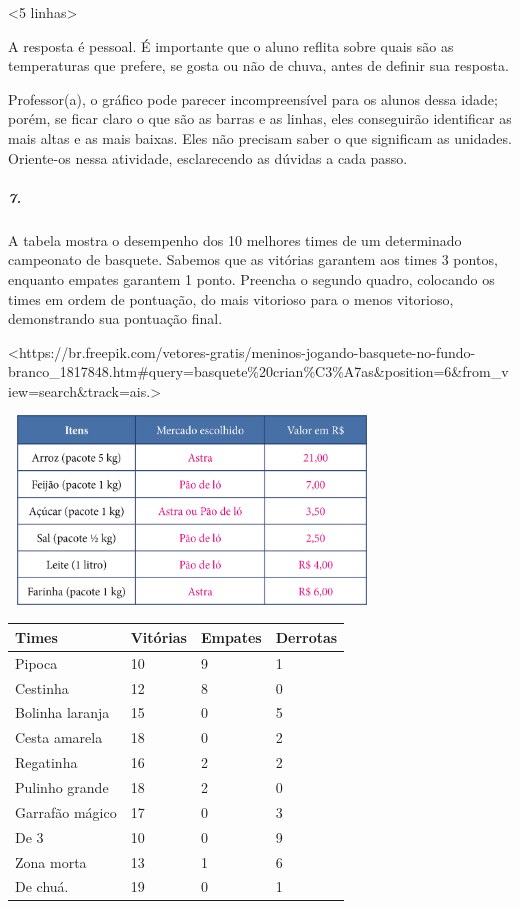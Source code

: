\textless{}5 linhas\textgreater{}

A resposta é pessoal. É importante que o aluno reflita sobre quais são as temperaturas que prefere, se gosta ou não de chuva, antes de definir sua resposta.

Professor(a), o gráfico pode parecer incompreensível para os alunos dessa idade; porém, se ficar claro o que são as barras e as linhas, eles
conseguirão identificar as mais altas e as mais baixas. Eles não
precisam saber o que significam as unidades. Oriente-os nessa atividade, esclarecendo as dúvidas a cada passo.

\subparagraph{7.}\label{section-82}

A tabela mostra o desempenho dos 10 melhores times de um
determinado campeonato de basquete. Sabemos que as vitórias garantem aos
times 3 pontos, enquanto empates garantem 1 ponto. Preencha o segundo quadro,
colocando os times em ordem de pontuação, do mais vitorioso para o menos
vitorioso, demonstrando sua pontuação final.

\textless{}https://br.freepik.com/vetores-gratis/meninos-jogando-basquete-no-fundo-branco\_1817848.htm\#query=basquete\%20crian\%C3\%A7as\&position=6\&from\_view=search\&track=ais.\textgreater{}

\includegraphics[width=3.83333in,height=1.97257in]{media/image93.png}

\begin{longtable}[]{@{}llll@{}}
\toprule
Times & Vitórias & Empates & Derrotas\tabularnewline
\midrule
\endhead
Pipoca & 10 & 9 & 1\tabularnewline
Cestinha & 12 & 8 & 0\tabularnewline
Bolinha laranja & 15 & 0 & 5\tabularnewline
Cesta amarela & 18 & 0 & 2\tabularnewline
Regatinha & 16 & 2 & 2\tabularnewline
Pulinho grande & 18 & 2 & 0\tabularnewline
Garrafão mágico & 17 & 0 & 3\tabularnewline
De 3 & 10 & 0 & 9\tabularnewline
Zona morta & 13 & 1 & 6\tabularnewline
De chuá. & 19 & 0 & 1\tabularnewline
\bottomrule
\end{longtable}

